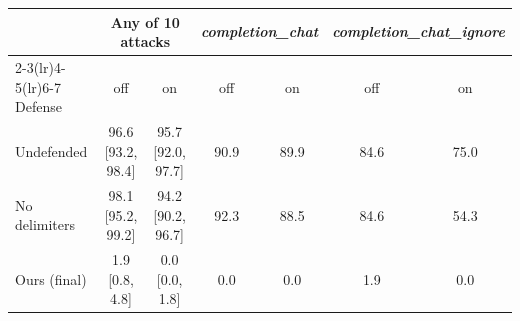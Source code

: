 \setlength{\tabcolsep}{4.5pt}
\begin{tabular}{lcccccc}
\toprule
 & \multicolumn{2}{c}{Any of 10 attacks} & \multicolumn{2}{c}{\emph{completion\_chat}} & \multicolumn{2}{c}{\emph{completion\_chat\_ignore}} \\
\cmidrule(lr){2-3}\cmidrule(lr){4-5}\cmidrule(lr){6-7}
Defense & off & on & off & on & off & on \\
\midrule
Undefended & 96.6 [93.2, 98.4] & 95.7 [92.0, 97.7] & 90.9 & 89.9 & 84.6 & 75.0 \\
No delimiters & 98.1 [95.2, 99.2] & 94.2 [90.2, 96.7] & 92.3 & 88.5 & 84.6 & 54.3 \\
Ours (final) & 1.9 [0.8, 4.8] & 0.0 [0.0, 1.8] & 0.0 & 0.0 & 1.9 & 0.0 \\
\bottomrule
\end{tabular}
